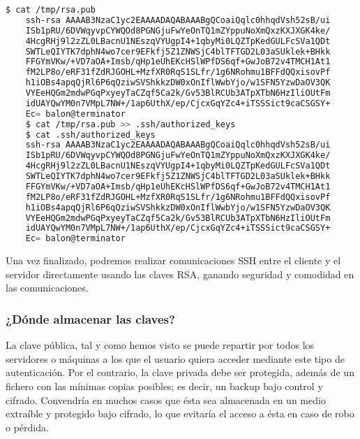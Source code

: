 \documentclass[a4paper, 11pt, titlepage]{article}
\begin{document}
        \begin{lstlisting}[language=bash,basicstyle=\scriptsize]
    $ cat /tmp/rsa.pub
    ssh-rsa AAAAB3NzaC1yc2EAAAADAQABAAABgQCoaiQqlc0hhqdVsh52sB/ui
    ISb1pRU/6DVWqyvpCYWQOd8PGNGjuFwYeOnTQ1mZYppuNoXmQxzKXJXGK4ke/
    4HcgRHj9l2zZL0LBacnU1NEszqVYUgpI4+1qbyMi0LQZTpKedGULFcSVa1QDt
    SWTLeQIYTK7dphN4wo7cer9EFkfj5Z1ZNWSjC4blTFTGD2L03aSUklek+BHkk
    FFGYmVKw/+VD7aOA+Imsb/qHp1eUhEKcHSlWPfDS6qf+GwJoB72v4TMCH1At1
    fM2LP8o/eRF31fZdRJGOHL+MzfXR0RqS1SLfr/1g6NRohmu1BFFdQQxisovPf
    h1iOBs4apqQjRl6P6qQziwSVShkkzDW0xOnIflWwbYjo/w1SFN5YzwDaOV3QK
    VYEeHQGm2mdwPGqPxyeyTaCZqf5Ca2k/Gv53BlRCUb3ATpXTbN6HzIliOUtFm
    idUAYQwYM0n7VMpL7NW+/1ap6UthX/ep/CjcxGqYZc4+iTSSSict9caCSGSY+
    Ec= balon@terminator
    $ cat /tmp/rsa.pub >> .ssh/authorized_keys
    $ cat .ssh/authorized_keys
    ssh-rsa AAAAB3NzaC1yc2EAAAADAQABAAABgQCoaiQqlc0hhqdVsh52sB/ui
    ISb1pRU/6DVWqyvpCYWQOd8PGNGjuFwYeOnTQ1mZYppuNoXmQxzKXJXGK4ke/
    4HcgRHj9l2zZL0LBacnU1NEszqVYUgpI4+1qbyMi0LQZTpKedGULFcSVa1QDt
    SWTLeQIYTK7dphN4wo7cer9EFkfj5Z1ZNWSjC4blTFTGD2L03aSUklek+BHkk
    FFGYmVKw/+VD7aOA+Imsb/qHp1eUhEKcHSlWPfDS6qf+GwJoB72v4TMCH1At1
    fM2LP8o/eRF31fZdRJGOHL+MzfXR0RqS1SLfr/1g6NRohmu1BFFdQQxisovPf
    h1iOBs4apqQjRl6P6qQziwSVShkkzDW0xOnIflWwbYjo/w1SFN5YzwDaOV3QK
    VYEeHQGm2mdwPGqPxyeyTaCZqf5Ca2k/Gv53BlRCUb3ATpXTbN6HzIliOUtFm
    idUAYQwYM0n7VMpL7NW+/1ap6UthX/ep/CjcxGqYZc4+iTSSSict9caCSGSY+
    Ec= balon@terminator\end{lstlisting}
        
        Una vez finalizado, podremos realizar comunicaciones SSH entre el cliente y 
        el servidor directamente usando las claves RSA, ganando seguridad y comodidad 
        en las comunicaciones.

        \subsubsection{¿Dónde almacenar las claves?}

            La clave pública, tal y como hemos visto se puede repartir por todos los servidores o máquinas 
            a los que el usuario quiera acceder mediante este tipo de autenticación. Por el contrario, la 
            clave privada debe ser protegida, además de un fichero con las mínimas copias posibles; es decir, 
            un backup bajo control y cifrado. Convendría en muchos casos que ésta sea almacenada en un medio 
            extraíble y protegido bajo cifrado, lo que evitaría el acceso a ésta en caso de robo o pérdida.
\end{document}
